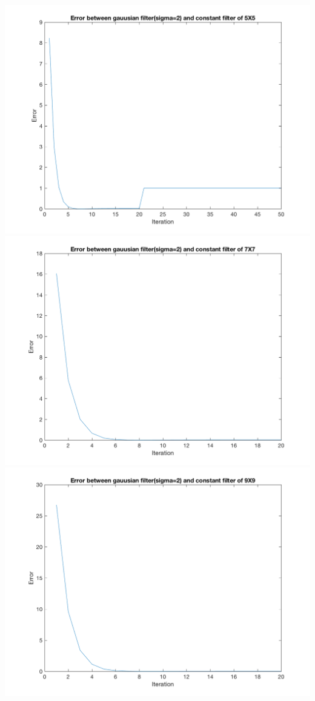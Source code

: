 \documentclass[fleqn]{article}
\begin{document}
\includegraphics[scale=0.8]{Error5.png}
\includegraphics[scale=0.8]{Error7.png}
\includegraphics[scale=0.8]{Error9.png}
\end{document}
